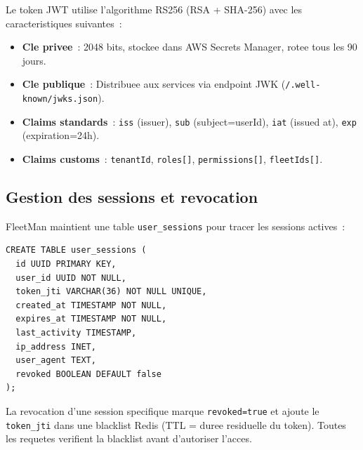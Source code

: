 \documentclass[12pt,a4paper]{report}
\begin{document}
Le token JWT utilise l'algorithme RS256 (RSA + SHA-256) avec les caracteristiques
suivantes~:

\begin{itemize}[leftmargin=2cm]
  \item \textbf{Cle privee}~: 2048 bits, stockee dans AWS Secrets Manager,
        rotee tous les 90 jours.
  \item \textbf{Cle publique}~: Distribuee aux services via endpoint JWK
        (\texttt{/.well-known/jwks.json}).
  \item \textbf{Claims standards}~: \texttt{iss} (issuer), \texttt{sub}
        (subject=userId), \texttt{iat} (issued at), \texttt{exp}
        (expiration=24h).
  \item \textbf{Claims customs}~: \texttt{tenantId}, \texttt{roles[]},
        \texttt{permissions[]}, \texttt{fleetIds[]}.
\end{itemize}

\subsection{Gestion des sessions et revocation}

FleetMan maintient une table \texttt{user\_sessions} pour tracer les
sessions actives~:

\begin{verbatim}
CREATE TABLE user_sessions (
  id UUID PRIMARY KEY,
  user_id UUID NOT NULL,
  token_jti VARCHAR(36) NOT NULL UNIQUE,
  created_at TIMESTAMP NOT NULL,
  expires_at TIMESTAMP NOT NULL,
  last_activity TIMESTAMP,
  ip_address INET,
  user_agent TEXT,
  revoked BOOLEAN DEFAULT false
);
\end{verbatim}

La revocation d'une session specifique marque \texttt{revoked=true} et
ajoute le \texttt{token\_jti} dans une blacklist Redis (TTL = duree residuelle
du token). Toutes les requetes verifient la blacklist avant d'autoriser l'acces.
\end{document}

